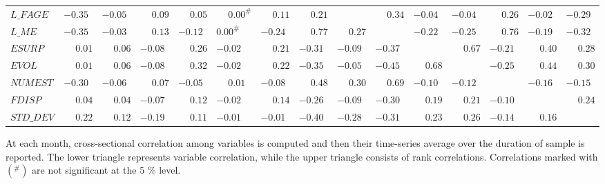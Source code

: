 \begin{landscape}
\begin{table}
\begin{threeparttable}
\begin{tabular}[t]{lllllllllllllll}
\addlinespace
$L\_FAGE$ & $-0.35$ & $-0.05$ & $\phantom{-}0.09$ & $\phantom{-}0.05$ & $\phantom{-}0.00^\#$ & $\phantom{-}0.11$ & $\phantom{-}0.21$ &  & $\phantom{-}0.34$ & $-0.04$ & $-0.04$ & $\phantom{-}0.26$ & $-0.02$ & $-0.29$\\
\addlinespace
$L\_ME$ & $-0.35$ & $-0.03$ & $\phantom{-}0.13$ & $-0.12$ & $0.00^\#$ & $-0.24$ & $\phantom{-}0.77$ & $\phantom{-}0.27$ &  & $-0.22$ & $-0.25$ & $\phantom{-}0.76$ & $-0.19$ & $-0.32$\\
\addlinespace
$ESURP$ & $\phantom{-}0.01$ & $\phantom{-}0.06$ & $-0.08$ & $\phantom{-}0.26$ & $-0.02$ & $\phantom{-}0.21$ & $-0.31$ & $-0.09$ & $-0.37$ &  & $\phantom{-}0.67$ & $-0.21$ & $\phantom{-}0.40$ & $\phantom{-}0.28$\\
\addlinespace
$EVOL$ & $\phantom{-}0.01$ & $\phantom{-}0.06$ & $-0.08$ & $\phantom{-}0.32$ & $-0.02$ & $\phantom{-}0.22$ & $-0.35$ & $-0.05$ & $-0.45$ & $\phantom{-}0.68$ &  & $-0.25$ & $\phantom{-}0.44$ & $\phantom{-}0.30$\\
\addlinespace
$NUMEST$ & $-0.30$ & $-0.06$ & $\phantom{-}0.07$ & $-0.05$ & $\phantom{-}0.01$ & $-0.08$ & $\phantom{-}0.48$ & $\phantom{-}0.30$ & $\phantom{-}0.69$ & $-0.10$ & $-0.12$ &  & $-0.16$ & $-0.15$\\
\addlinespace
$FDISP$ & $\phantom{-}0.04$ & $\phantom{-}0.04$ & $-0.07$ & $\phantom{-}0.12$ & $-0.02$ & $\phantom{-}0.14$ & $-0.26$ & $-0.09$ & $-0.30$ & $\phantom{-}0.19$ & $\phantom{-}0.21$ & $-0.10$ &  & $\phantom{-}0.24$\\
\addlinespace
$STD\_DEV$ & $\phantom{-}0.22$ & $\phantom{-}0.12$ & $-0.19$ & $\phantom{-}0.11$ & $-0.01$ & $-0.01$ & $-0.40$ & $-0.28$ & $-0.31$ & $\phantom{-}0.23$ & $\phantom{-}0.26$ & $-0.14$ & $\phantom{-}0.16$ & \\
\bottomrule
\end{tabular}
\begin{tablenotes}
\item At each month, cross-sectional correlation among variables is computed and then their time-series average over the duration of sample is reported. The lower triangle represents variable correlation, while the upper triangle consists of rank correlations. Correlations marked with $(\phantom{}^\#)$ are not significant at the 5 \% level.
\end{tablenotes}
\end{threeparttable}
\end{table}
\end{landscape}
\restoregeometry